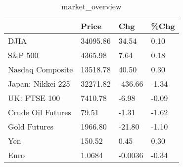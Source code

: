 \documentclass{article}%
\begin{document}
%


\begin{table}[htbp]%
\caption{market\_overview}%
\centering%
\begin{adjustbox}{width=1\textwidth}%
\begin{tabular}{llll}
\toprule
                  &    Price &     Chg &  \%Chg \\
\midrule
             DJIA & 34095.86 &   34.54 &  0.10 \\
          S\&P 500 &  4365.98 &    7.64 &  0.18 \\
 Nasdaq Composite & 13518.78 &   40.50 &  0.30 \\
Japan: Nikkei 225 & 32271.82 & -436.66 & -1.34 \\
     UK: FTSE 100 &  7410.78 &   -6.98 & -0.09 \\
Crude Oil Futures &    79.51 &   -1.31 & -1.62 \\
     Gold Futures &  1966.80 &  -21.80 & -1.10 \\
              Yen &   150.52 &    0.45 &  0.30 \\
             Euro &   1.0684 & -0.0036 & -0.34 \\
\bottomrule
\end{tabular}
%
\end{adjustbox}%
\end{table}

%
\end{document}
